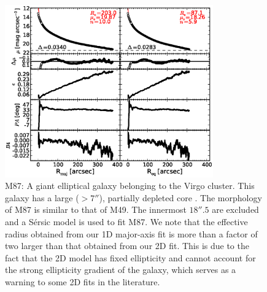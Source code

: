 \documentclass[preprint2]{emulateapj}
\newcommand{\fitfigurewidth}{0.8\textwidth}
\begin{document}
  \begin{figure}[h]
  \begin{center}
  \includegraphics[width=\fitfigurewidth]{images/m87_1Dfit.eps}
  \caption{M87:
  A giant elliptical galaxy belonging to the Virgo cluster.
  This galaxy has a large ($> 7''$), partially depleted core \citep{ferrarese2006acsvcs}.
  The morphology of M87 is similar to that of M49.
  The innermost $18''.5$ are excluded and
  a S\'ersic model is used to fit M87. 
  We note that the effective radius obtained from our 1D major-axis fit is more than a factor of two larger than that obtained from our 2D fit.
  This is due to the fact that the 2D model has fixed ellipticity and cannot account for the strong ellipticity gradient of the galaxy, 
  which serves as a warning to some 2D fits in the literature.  
  }
  \end{center}
  \end{figure}
\end{document}
